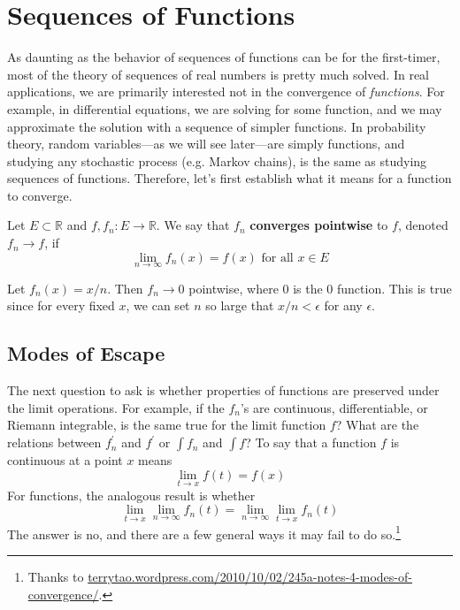 \section{Sequences of Functions}

  As daunting as the behavior of sequences of functions can be for the first-timer, most of the theory of sequences of real numbers is pretty much solved. In real applications, we are primarily interested not in the convergence of \textit{functions}. For example, in differential equations, we are solving for some function, and we may approximate the solution with a sequence of simpler functions. In probability theory, random variables---as we will see later---are simply functions, and studying any stochastic process (e.g. Markov chains), is the same as studying sequences of functions. Therefore, let's first establish what it means for a function to converge. 

  \begin{definition}
    \label{def:pointwise-convergence}
    Let $E \subset \mathbb{R}$ and $f, f_n : E \to \mathbb{R}$. We say that $f_n$ \textbf{converges pointwise} to $f$, denoted $f_n \to f$, if 
    \begin{equation}
      \lim_{n \to \infty} f_n (x) = f(x) \text{ for all } x \in E
    \end{equation}
  \end{definition}

  \begin{example}
    \label{ex:pointwise-convergence-of-xn}
    Let $f_n (x) = x/n$. Then $f_n \to 0$ pointwise, where $0$ is the $0$ function. This is true since for every fixed $x$, we can set $n$ so large that $x/n < \epsilon$ for any $\epsilon$. 
  \end{example}

\subsection{Modes of Escape}

  The next question to ask is whether properties of functions are preserved under the limit operations. For example, if the $f_n$'s are continuous, differentiable, or Riemann integrable, is the same true for the limit function $f$? What are the relations between $f_n^\prime$ and $f^\prime$ or $\int f_n$ and $\int f$? To say that a function $f$ is continuous at a point $x$ means 
  \begin{equation}
    \lim_{t \to x} f(t) = f(x)
  \end{equation}
  For functions, the analogous result is whether 
  \begin{equation}
    \lim_{t \to x} \lim_{n \to \infty} f_n (t) = \lim_{n \to \infty} \lim_{t \to x} f_n (t)
  \end{equation} 
  The answer is no, and there are a few general ways it may fail to do so.\footnote{Thanks to \href{https://terrytao.wordpress.com/2010/10/02/245a-notes-4-modes-of-convergence/}{terrytao.wordpress.com/2010/10/02/245a-notes-4-modes-of-convergence/}.}

